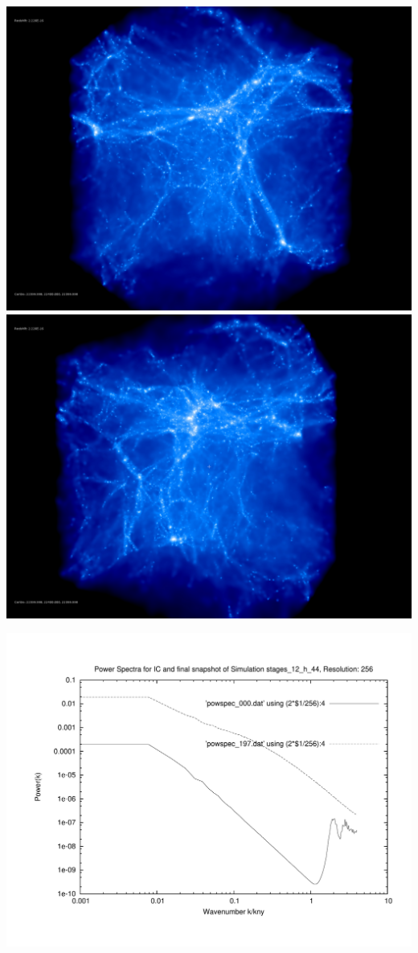 \includegraphics[scale=0.1]{r256/h70/stages_12_h_44/rotate_00074.jpg} \\
\includegraphics[scale=0.15]{r256/h70/stages_12_h_44/rotate_00131.jpg} 

\includegraphics[scale=0.5]{r256/h70/stages_12_h_44/plot_powspec_stages_12_h_44.pdf}

